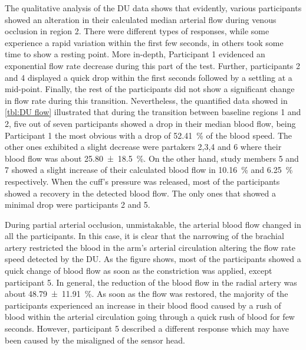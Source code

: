 The qualitative analysis of the DU data shows that evidently, various participants showed an alteration in their calculated median arterial flow during venous occlusion in region 2. There were different types of responses, while some experience a rapid variation within the first few seconds, in others took some time to show a resting point. More in-depth, Participant 1 evidenced an exponential flow rate decrease during this part of the test. Further, participants 2 and 4 displayed a quick drop within the first seconds followed by a settling at a mid-point. Finally, the rest of the participants did not show a significant change in flow rate during this transition. Nevertheless, the quantified data showed in \ref{tbl:DU flow} illustrated that during the transition between baseline regions 1 and 2, five out of seven participants showed a drop in their median blood flow, being Participant 1 the most obvious with a drop of \SI{52.41}{\percent} of the blood speed. The other ones exhibited a slight decrease were partakers 2,3,4 and 6 where their blood flow was about \SI{25.80(1850)}{\percent}. On the other hand, study members 5 and 7 showed a slight increase of their calculated blood flow in \SI{10.16}{\percent} and \SI{6.25}{\percent} respectively. When the cuff's pressure was released, most of the participants showed a recovery in the detected blood flow. The only ones that showed a minimal drop were participants 2 and 5.

During partial arterial occlusion, unmistakable, the arterial blood flow changed in all the participants. In this case, it is clear that the narrowing of the brachial artery restricted the blood in the arm's arterial circulation altering the flow rate speed detected by the DU. As the figure shows, most of the participants showed a quick change of blood flow as soon as the constriction was applied, except participant 5. In general, the reduction of the blood flow in the radial artery was about \SI{48.79(1191)}{\percent}. As soon as the flow was restored, the majority of the participants experienced an increase in their blood flood caused by a rush of blood within the arterial circulation going through a quick rush of blood for few seconds. However, participant 5 described a different response which may have been caused by the misaligned of the sensor head.  


